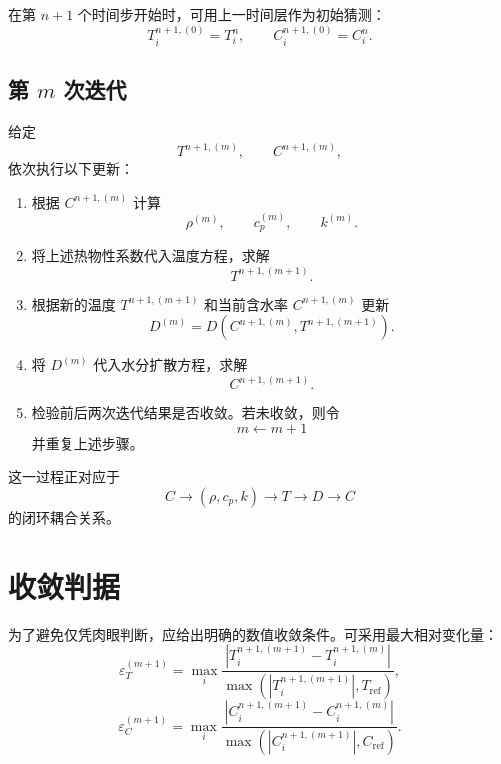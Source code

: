 \documentclass[UTF8,a4paper,12pt]{ctexart}
\begin{document}
在第 $n+1$ 个时间步开始时，可用上一时间层作为初始猜测：
\begin{equation}
    T_i^{n+1,(0)}=T_i^n,
    \qquad
    C_i^{n+1,(0)}=C_i^n.
\end{equation}

\subsection{第 $m$ 次迭代}

给定
\[
T^{n+1,(m)},\qquad C^{n+1,(m)},
\]
依次执行以下更新：

\begin{enumerate}
    \item 根据 $C^{n+1,(m)}$ 计算
    \[
    \rho^{(m)},\qquad
    c_p^{(m)},\qquad
    k^{(m)}.
    \]

    \item 将上述热物性系数代入温度方程，求解
    \[
    T^{n+1,(m+1)}.
    \]

    \item 根据新的温度 $T^{n+1,(m+1)}$ 和当前含水率 $C^{n+1,(m)}$ 更新
    \[
    D^{(m)}
    =
    D\!\left(
        C^{n+1,(m)},
        T^{n+1,(m+1)}
    \right).
    \]

    \item 将 $D^{(m)}$ 代入水分扩散方程，求解
    \[
    C^{n+1,(m+1)}.
    \]

    \item 检验前后两次迭代结果是否收敛。若未收敛，则令
    \[
    m\leftarrow m+1
    \]
    并重复上述步骤。
\end{enumerate}

这一过程正对应于
\[
C
\rightarrow
(\rho,c_p,k)
\rightarrow
T
\rightarrow
D
\rightarrow
C
\]
的闭环耦合关系。

\section{收敛判据}

为了避免仅凭肉眼判断，应给出明确的数值收敛条件。可采用最大相对变化量：
\begin{equation}
    \varepsilon_T^{(m+1)}
    =
    \max_i
    \frac{
        \left|
        T_i^{n+1,(m+1)}
        -
        T_i^{n+1,(m)}
        \right|
    }{
        \max\left(
            |T_i^{n+1,(m+1)}|,
            T_{\mathrm{ref}}
        \right)
    },
    \label{eq:epsT}
\end{equation}
\begin{equation}
    \varepsilon_C^{(m+1)}
    =
    \max_i
    \frac{
        \left|
        C_i^{n+1,(m+1)}
        -
        C_i^{n+1,(m)}
        \right|
    }{
        \max\left(
            |C_i^{n+1,(m+1)}|,
            C_{\mathrm{ref}}
        \right)
    }.
    \label{eq:epsC}
\end{equation}
\end{document}
